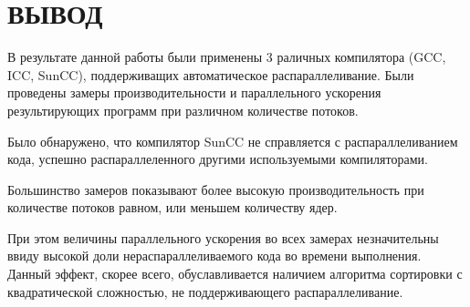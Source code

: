 \documentclass[14pt, a4paper, oneside, final]{extarticle}
\begin{document}
\clearpage
\section*{ВЫВОД}
В результате данной работы были применены 3 раличных компилятора (GCC, ICC, SunCC), поддерживащих автоматическое распараллеливание. Были проведены замеры производительности и параллельного ускорения результирующих программ при различном количестве потоков.

Было обнаружено, что компилятор SunCC не справляется с распараллеливанием кода, успешно распараллеленного другими используемыми компиляторами.

Большинство замеров показывают более высокую производительность при количестве потоков равном, или меньшем количеству ядер.

При этом величины параллельного ускорения во всех замерах незначительны ввиду высокой доли нераспараллеливаемого кода во времени выполнения. Данный эффект, скорее всего, обуславливается наличием алгоритма сортировки с квадратической сложностью, не поддерживающего распараллеливание.
\end{document}
